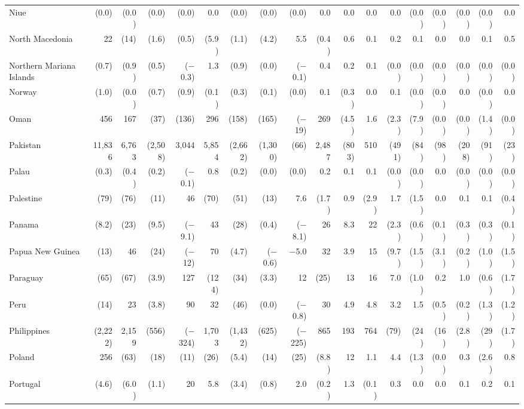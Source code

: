 \begin{longtable}{lrrrrrrrrrrrrrrrrr}
Niue & (0.0) & (0.0) & (0.0) & (0.0) & 0.0 & (0.0) & (0.0) & (0.0) & 0.0 & 0.0 & 0.0 & 0.0 & (0.0) & (0.0) & (0.0) & (0.0) & 0.0 \\
North Macedonia & 22 & (14) & (1.6) & (0.5) & (5.9) & (1.1) & (4.2) & 5.5 & (0.4) & 0.6 & 0.1 & 0.2 & 0.1 & 0.0 & 0.0 & 0.1 & 0.5 \\
Northern Mariana Islands & (0.7) & (0.9) & (0.5) & ($-$0.3) & 1.3 & (0.9) & (0.0) & ($-$0.1) & 0.4 & 0.2 & 0.1 & (0.0) & (0.0) & (0.0) & (0.0) & (0.0) & (0.0) \\
Norway & (1.0) & (0.0) & (0.7) & (0.9) & (0.1) & (0.3) & (0.1) & (0.0) & 0.1 & (0.3) & 0.0 & 0.1 & (0.0) & (0.0) & 0.0 & (0.0) & 0.0 \\
Oman & 456 & 167 & (37) & (136) & 296 & (158) & (165) & ($-$19) & 269 & (4.5) & 1.6 & (2.3) & (7.9) & (0.0) & (0.0) & (1.4) & (0.0) \\
Pakistan & 11,836 & 6,763 & (2,508) & 3,044 & 5,854 & (2,662) & (1,300) & (66) & 2,487 & (803) & 510 & (491) & (84) & (98) & (208) & (91) & (23) \\
Palau & (0.3) & (0.4) & (0.2) & ($-$0.1) & 0.8 & (0.2) & (0.0) & (0.0) & 0.2 & 0.1 & 0.1 & (0.0) & (0.0) & 0.0 & (0.0) & (0.0) & (0.0) \\
Palestine & (79) & (76) & (11) & 46 & (70) & (51) & (13) & 7.6 & (1.7) & 0.9 & (2.9) & 1.7 & (1.5) & 0.0 & 0.1 & 0.1 & (0.4) \\
Panama & (8.2) & (23) & (9.5) & ($-$9.1) & 43 & (28) & (0.4) & ($-$8.1) & 26 & 8.3 & 22 & (2.3) & (0.6) & (0.1) & (0.3) & (0.3) & (0.1) \\
Papua New Guinea & (13) & 46 & (24) & ($-$12) & 70 & (4.7) & ($-$0.6) & $-$5.0 & 32 & 3.9 & 15 & (9.7) & (1.5) & (3.1) & (0.2) & (1.0) & (1.5) \\
Paraguay & (65) & (67) & (3.9) & 127 & (124) & (34) & (3.3) & 12 & (25) & 13 & 16 & 7.0 & (1.0) & 0.2 & 1.0 & (0.6) & (1.7) \\
Peru & (14) & 23 & (3.8) & 90 & 32 & (46) & (0.0) & ($-$0.8) & 30 & 4.9 & 4.8 & 3.2 & 1.5 & (0.5) & (0.2) & (1.3) & (1.2) \\
Philippines & (2,222) & 2,159 & (556) & ($-$324) & 1,703 & (1,432) & (625) & ($-$225) & 865 & 193 & 764 & (79) & (24) & (16) & (2.8) & (29) & (1.7) \\
Poland & 256 & (63) & (18) & (11) & (26) & (5.4) & (14) & (25) & (8.8) & 12 & 1.1 & 4.4 & (1.3) & (0.0) & 0.3 & (2.6) & 0.8 \\
Portugal & (4.6) & (6.0) & (1.1) & 20 & 5.8 & (3.4) & (0.8) & 2.0 & (0.2) & 1.3 & (0.1) & 0.3 & 0.0 & 0.0 & 0.1 & 0.2 & 0.1 \\

\end{longtable}

